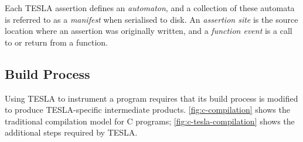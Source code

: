 Each TESLA assertion defines an \emph{automaton}, and a collection of
these automata is referred to as a \emph{manifest} when serialised to
disk. An \emph{assertion site} is the source location where an assertion
was originally written, and a \emph{function event} is a call to or
return from a function.

\subsection{Build Process} \label{sec:build-tesla}

Using TESLA to instrument a program requires that its build process is modified
to produce TESLA-specific intermediate products. \autoref{fig:c-compilation}
shows the traditional compilation model for C programs;
\autoref{fig:c-tesla-compilation} shows the additional steps required by TESLA.

